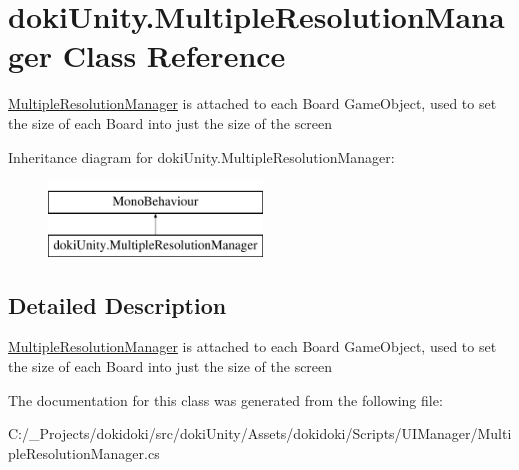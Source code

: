 \hypertarget{classdoki_unity_1_1_multiple_resolution_manager}{}\section{doki\+Unity.\+Multiple\+Resolution\+Manager Class Reference}
\label{classdoki_unity_1_1_multiple_resolution_manager}


\hyperlink{classdoki_unity_1_1_multiple_resolution_manager}{Multiple\+Resolution\+Manager} is attached to each Board Game\+Object, used to set the size of each Board into just the size of the screen  


Inheritance diagram for doki\+Unity.\+Multiple\+Resolution\+Manager\+:\begin{figure}[H]
\begin{center}
\leavevmode
\includegraphics[height=2.000000cm]{classdoki_unity_1_1_multiple_resolution_manager}
\end{center}
\end{figure}


\subsection{Detailed Description}
\hyperlink{classdoki_unity_1_1_multiple_resolution_manager}{Multiple\+Resolution\+Manager} is attached to each Board Game\+Object, used to set the size of each Board into just the size of the screen 



The documentation for this class was generated from the following file\+:\begin{DoxyCompactItemize}
\item 
C\+:/\+\_\+\+Projects/dokidoki/src/doki\+Unity/\+Assets/dokidoki/\+Scripts/\+U\+I\+Manager/Multiple\+Resolution\+Manager.\+cs\end{DoxyCompactItemize}
